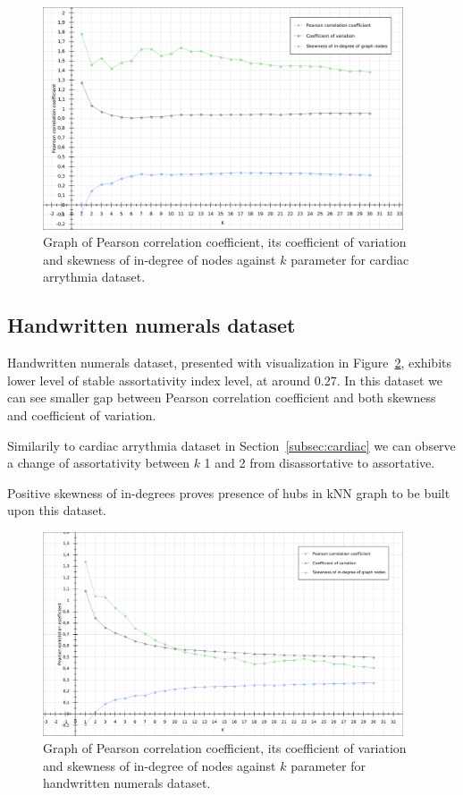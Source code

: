 \begin{figure}[h!]
  \centering
  \captionsetup{justification=centering}
    \includegraphics[width=0.95\textwidth]{images/arrythmia_pearson.png}
  \caption{Graph of Pearson correlation coefficient, its coefficient of variation and skewness of in-degree of nodes against $k$ parameter for cardiac arrythmia dataset.}
  \label{fig:graph_arrythmia_pearson}
\end{figure}


\subsection{Handwritten numerals dataset}
Handwritten numerals dataset, presented with visualization in Figure~\ref{fig:graph_mfeat_pearson}, exhibits lower level of stable assortativity index level, at around $0.27$.
In this dataset we can see smaller gap between Pearson correlation coefficient and both skewness and coefficient of variation.

Similarily to cardiac arrythmia dataset in Section~\ref{subsec:cardiac} we can observe a change of assortativity between $k$ 1 and 2 from disassortative to assortative.

Positive skewness of in-degrees proves presence of hubs in kNN graph to be built upon this dataset.

\begin{figure}[h!]
  \centering
  \captionsetup{justification=centering}
    \includegraphics[width=0.95\textwidth]{images/mfeat_pearson.png}
  \caption{Graph of Pearson correlation coefficient, its coefficient of variation and skewness of in-degree of nodes against $k$ parameter for handwritten numerals dataset.}
  \label{fig:graph_mfeat_pearson}
\end{figure}


